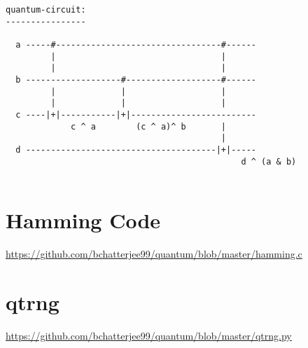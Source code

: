 \documentclass{article}
\begin{document}
\begin{verbatim}
quantum-circuit:
----------------

  a -----#---------------------------------#------
         |                                 |
         |                                 |
  b -------------------#-------------------#------
         |             |                   |
         |             |                   |
  c ----|+|-----------|+|-------------------------
             c ^ a        (c ^ a)^ b       |
                                           |
  d --------------------------------------|+|-----
                                               d ^ (a & b)


\end{verbatim}


\section{Hamming Code}
\href{https://github.com/bchatterjee99/quantum/blob/master/hamming.c}{https://github.com/bchatterjee99/quantum/blob/master/hamming.c}



\section{qtrng}
\href{https://github.com/bchatterjee99/quantum/blob/master/qtrng.py}{https://github.com/bchatterjee99/quantum/blob/master/qtrng.py}






\end{document}
